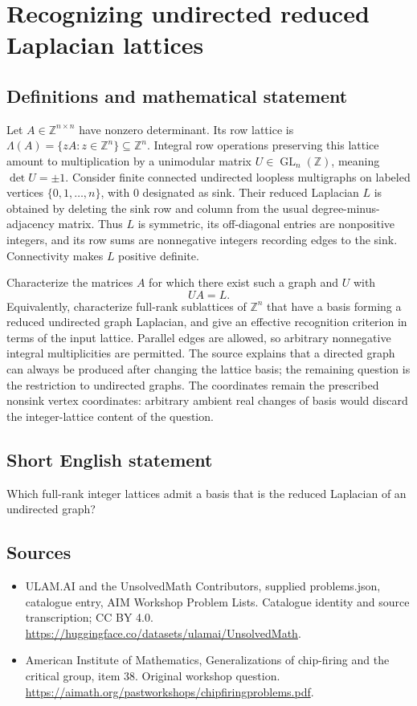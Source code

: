 \documentclass[11pt,a4paper]{article}
\begin{document}
\section*{Recognizing undirected reduced Laplacian lattices}\label{statement}

\subsection{Definitions and mathematical statement}
Let $A\in\mathbb Z^{n\times n}$ have nonzero determinant.
Its row lattice is $\Lambda(A)=\{zA:z\in\mathbb Z^n\}\subseteq\mathbb Z^n$.
Integral row operations preserving this lattice amount to multiplication by a unimodular matrix $U\in\operatorname{GL}_n(\mathbb Z)$, meaning $\det U=\pm1$.
Consider finite connected undirected loopless multigraphs on labeled vertices $\{0,1,\ldots,n\}$, with $0$ designated as sink.
Their reduced Laplacian $L$ is obtained by deleting the sink row and column from the usual degree-minus-adjacency matrix.
Thus $L$ is symmetric, its off-diagonal entries are nonpositive integers, and its row sums are nonnegative integers recording edges to the sink.
Connectivity makes $L$ positive definite.

Characterize the matrices $A$ for which there exist such a graph and $U$ with
\[
 UA=L.
\]
Equivalently, characterize full-rank sublattices of $\mathbb Z^n$ that have a basis forming a reduced undirected graph Laplacian, and give an effective recognition criterion in terms of the input lattice.
Parallel edges are allowed, so arbitrary nonnegative integral multiplicities are permitted.
The source explains that a directed graph can always be produced after changing the lattice basis; the remaining question is the restriction to undirected graphs.
The coordinates remain the prescribed nonsink vertex coordinates: arbitrary ambient real changes of basis would discard the integer-lattice content of the question.
\subsection{Short English statement}
Which full-rank integer lattices admit a basis that is the reduced Laplacian of an undirected graph?
\subsection{Sources}
\begin{itemize}
\item[S1] ULAM.AI and the UnsolvedMath Contributors, supplied problems.json, catalogue entry, AIM Workshop Problem Lists. Catalogue identity and source transcription; CC BY 4.0.
\url{https://huggingface.co/datasets/ulamai/UnsolvedMath}.
\item[S2] American Institute of Mathematics, Generalizations of chip-firing and the critical group, item 38. Original workshop question.
\url{https://aimath.org/pastworkshops/chipfiringproblems.pdf}.
\end{itemize}
\end{document}
